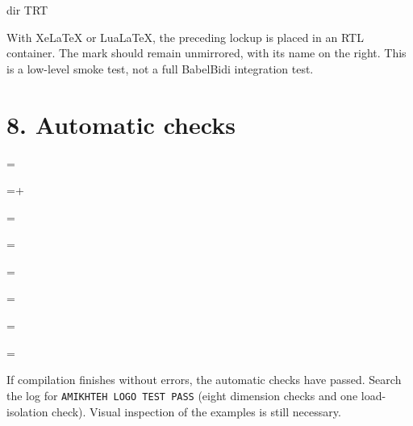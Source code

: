 \documentclass[a4paper,11pt]{article}
\newcommand*\CheckDimension[3]{%
  \LogoTestDelta=\dimexpr#1-#2\relax
  \ifdim\LogoTestDelta<0pt
    \LogoTestDelta=-\LogoTestDelta
  \fi
  \ifdim\LogoTestDelta>.1pt
    \PackageError{amikhteh-logo-test}{#3 failed}%
      {The measured dimension differs from the expected value by more than 0.1pt.}%
  \else
    \typeout{AMIKHTEH LOGO TEST PASS: #3}%
  \fi
}
\begin{document}
\ifXeTeX
  \begingroup
    \hbox{\beginR{}\endR}
  \endgroup
\else\ifLuaTeX
  \hbox dir TRT {}
\else
\fi\fi

With XeLaTeX or LuaLaTeX, the preceding lockup is placed in an RTL
container. The mark should remain unmirrored, with its name on the right.
This is a low-level smoke test, not a full BabelBidi integration test.

\section*{8. Automatic checks}

\sbox{\LogoTestBox}{\AmikhtehLogo[size=12mm,baseline=bottom]}
\CheckDimension{\wd\LogoTestBox}{12mm}{Square width}
\CheckDimension{\ht\LogoTestBox+\dp\LogoTestBox}{12mm}{Square total height}
\CheckDimension{\dp\LogoTestBox}{0pt}{Bottom baseline depth}

\sbox{\LogoTestBox}{\AmikhtehLogo[size=12mm,baseline=center]}
\CheckDimension{\ht\LogoTestBox}{6mm}{Centre baseline height}
\CheckDimension{\dp\LogoTestBox}{6mm}{Centre baseline depth}

\begingroup
  \sbox{\LogoTestBox}{\AmikhtehLogo[size=9mm]}
  \CheckDimension{\wd\LogoTestBox}{9mm}{Per-command size override}
  \sbox{\LogoTestBox}{\AmikhtehLogo}
  \CheckDimension{\wd\LogoTestBox}{14mm}{Override does not leak}
\endgroup
\sbox{\LogoTestBox}{\AmikhtehLogo}
\CheckDimension{\wd\LogoTestBox}{20mm}{Grouped setup does not leak}

If compilation finishes without errors, the automatic checks have passed.
Search the log for \texttt{AMIKHTEH LOGO TEST PASS} (eight dimension
checks and one load-isolation check).
Visual inspection of the examples is still necessary.
\end{document}
